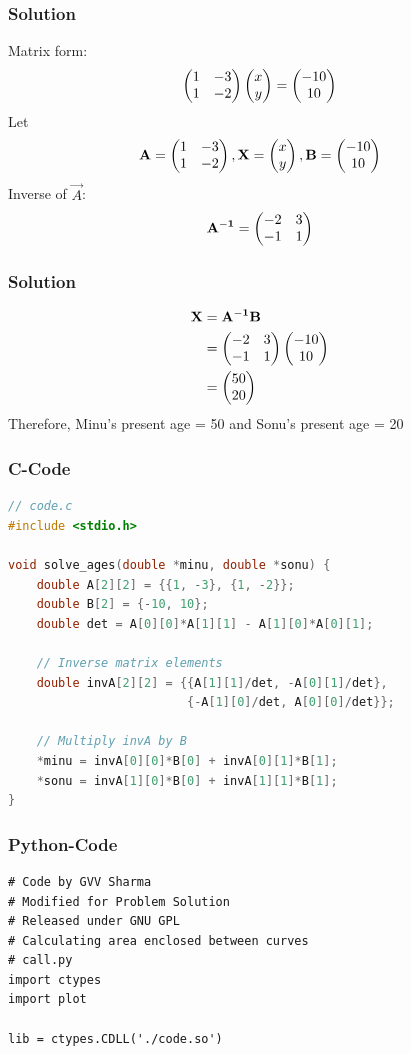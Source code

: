 \documentclass{beamer}
\begin{document}
\begin{frame}
\frametitle{Solution}
Matrix form:
\begin{align}
\begin{pmatrix}1 & -3 \\1 & -2\end{pmatrix}\begin{pmatrix}x \\ y\end{pmatrix}=\begin{pmatrix}-10 \\ 10\end{pmatrix}
\end{align}
Let 
\begin{align}
\mathbf{A} = \begin{pmatrix}1 & -3\\ 1 & -2\end{pmatrix},\mathbf{X} =\begin{pmatrix}x \\ y\end{pmatrix},\mathbf{B} =\begin{pmatrix}-10 \\ 10\end{pmatrix}
\end{align}
Inverse of $\vec{A}$:
\begin{align}
\mathbf{A^{-1}} =\begin{pmatrix}-2 & 3\\ -1 & 1\end{pmatrix} 
\end{align}
\end{frame}
\begin{frame}
\frametitle{Solution}
\begin{align}
\mathbf{X} &= \mathbf{A^{-1}}\mathbf{B} \\
&=\begin{pmatrix}-2 & 3\\ -1 & 1\end{pmatrix}\begin{pmatrix}-10 \\ 10\end{pmatrix} \\
&=\begin{pmatrix}50 \\ 20\end{pmatrix}
\end{align}
Therefore, Minu's present age = 50 and Sonu's present age = 20
\end{frame}
\begin{frame}[fragile]
\frametitle{C-Code}
\begin{lstlisting}[language=C]
// code.c
#include <stdio.h>

void solve_ages(double *minu, double *sonu) {
    double A[2][2] = {{1, -3}, {1, -2}};
    double B[2] = {-10, 10};
    double det = A[0][0]*A[1][1] - A[1][0]*A[0][1];

    // Inverse matrix elements
    double invA[2][2] = {{A[1][1]/det, -A[0][1]/det},
                         {-A[1][0]/det, A[0][0]/det}};

    // Multiply invA by B
    *minu = invA[0][0]*B[0] + invA[0][1]*B[1];
    *sonu = invA[1][0]*B[0] + invA[1][1]*B[1];
}
\end{lstlisting}
\end{frame}
\begin{frame}[fragile]
\frametitle{Python-Code}
\begin{lstlisting}
# Code by GVV Sharma
# Modified for Problem Solution
# Released under GNU GPL
# Calculating area enclosed between curves
# call.py
import ctypes
import plot

lib = ctypes.CDLL('./code.so')
\end{lstlisting}
\end{frame}
\end{document}
